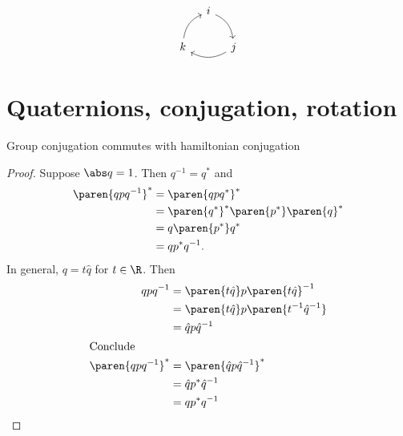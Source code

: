 \documentclass[draft]{scrartcl}
\begin{document}
\begin{multicols*}{2}
\[
  \begin{tikzcd}[column sep = 1em]
    & i \ar[bend left]{dr}\\
    k\ar[bend left]{ur} & &j \ar[bend left]{ll}
  \end{tikzcd}
\]
  \section{Quaternions, conjugation, rotation}
%
  \begin{lemma}
    Group conjugation commutes with hamiltonian conjugation
  \end{lemma}
  \begin{proof}
    Suppose \(\abs q=1\). Then \(q^{-1}=q^*\) and
    \begin{align*}
      \paren{qpq^{-1}}^* &= \paren{qpq^{*}}^* \\
                         &= \paren{q^*}^*\paren{p^*}\paren{q}^* \\
                         &= q\paren{p^*}q^* \\
                         &= q p^* q^{-1}.
    \end{align*}
    In general, \(q = t \hat q\) for \(t\in\R\). Then
    \begin{align*}
      qpq^{-1}&=\paren{t\hat q}p\paren{t\hat q}^{-1}  \\
              &= \paren{t\hat q} p \paren{t^{-1}\hat q^{-1}} \\
              &= \hat q p \hat q^{-1} \\
      \shortintertext{Conclude}
      \paren{qpq^{-1}}^* &= \paren{\hat q p \hat q^{-1}}^* \\
              &= \hat q p^* \hat q^{-1} \\
              &= qp^* q^{-1}
    \end{align*}


\end{proof}
\end{multicols*}
\end{document}
